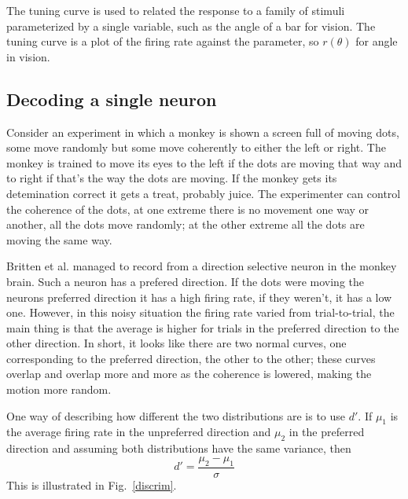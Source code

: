 \documentclass[11pt,a4paper]{scrartcl}
\begin{document}
The tuning curve is used to related the response to a family of
stimuli parameterized by a single variable, such as the angle of a bar
for vision. The tuning curve is a plot of the firing rate against the
parameter, so $r(\theta)$ for angle in vision. 

\subsection*{Decoding a single neuron}

Consider an experiment in which a monkey is shown a screen full of
moving dots, some move randomly but some move coherently to either the
left or right. The monkey is trained to move its eyes to the left if
the dots are moving that way and to right if that's the way the dots
are moving. If the monkey gets its detemination correct it gets a
treat, probably juice. The experimenter can control the coherence of
the dots, at one extreme there is no movement one way or another, all
the dots move randomly; at the other extreme all the dots are moving
the same way.

Britten et al. \cite{BrittenEtAl1992} managed to record from
a direction selective neuron in the monkey brain. Such a neuron has a
prefered direction. If the dots were moving the neurons preferred
direction it has a high firing rate, if they weren't, it has a low
one. However, in this noisy situation the firing rate varied from
trial-to-trial, the main thing is that the average is higher for
trials in the preferred direction to the other direction. In short, it
looks like there are two normal curves, one corresponding to the
preferred direction, the other to the other; these curves overlap and
overlap more and more as the coherence is lowered, making the motion
more random.

One way of describing how different the two distributions are is to
use $d'$. If $\mu_1$ is the average firing rate in the unpreferred
direction and $\mu_2$ in the preferred direction and assuming both
distributions have the same variance, then
\begin{equation}
d'=\frac{\mu_2-\mu_1}{\sigma}
\end{equation}
This is illustrated in Fig.~\ref{discrim}.
\end{document}
